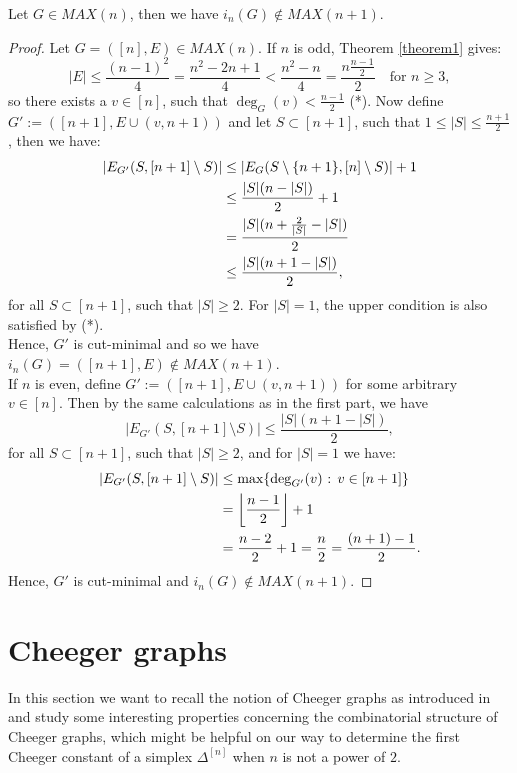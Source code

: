\begin{prop}
Let \(G\in MAX(n)\), then we have \(i_n(G)\notin MAX(n+1)\).
\begin{proof}
Let \(G=([n],E)\in MAX(n)\). If \(n\) is odd, Theorem \ref{theorem1} gives:
\[
|E|\leq\frac{(n-1)^2}{4}=\frac{n^2-2n+1}{4}<\frac{n^2-n}{4}=\frac{n\frac{n-1}{2}}{2}\quad\text{for }n\geq 3,
\]
so there exists a \(v\in [n]\), such that \(\deg_G(v)<\frac{n-1}{2}\) (*). Now define\\
\(G':=([n+1],E\cup (v,n+1))\) and let \(S\subset [n+1]\), such that \(1\leq |S|\leq\frac{n+1}{2}\), then we have:
\begin{align}
|E_{G'}(S,[n+1]\setminus S)|&\leq |E_G(S\setminus\{n+1\},[n]\setminus S)|+1\notag\\
&\leq\frac{|S|(n-|S|)}{2}+1\notag\\
&=\frac{|S|(n+\frac{2}{|S|}-|S|)}{2}\notag\\
&\leq\frac{|S|(n+1-|S|)}{2},\notag
\end{align}
for all \(S\subset [n+1]\), such that \(|S|\geq 2\). For \(|S|=1\), the upper condition is also satisfied by (*).\\
Hence, \(G'\) is cut-minimal and so we have \(i_n(G)=([n+1],E)\notin MAX(n+1)\).\\
If \(n\) is even, define \(G':=([n+1],E\cup (v,n+1))\) for some arbitrary \(v\in [n]\). Then by the same calculations as in the first part, we have
\[
|E_{G'}(S,[n+1]\setminus S)|\leq\frac{|S|(n+1-|S|)}{2},
\]
for all \(S\subset [n+1]\), such that \(|S|\geq 2\), and for \(|S|=1\) we have:
\begin{align}
|E_{G'}(S,[n+1]\setminus S)|&\leq\text{max}\{\deg_{G'}(v)\text{ : }v\in[n+1]\}\notag\\
&=\left\lfloor\frac{n-1}{2}\right\rfloor +1\notag\\
&=\frac{n-2}{2}+1=\frac{n}{2}=\frac{(n+1)-1}{2}.\notag
\end{align}
Hence, \(G'\) is cut-minimal and \(i_n(G)\notin MAX(n+1)\).
\end{proof}
\end{prop}

\section{Cheeger graphs}\label{section32}

In this section we want to recall the notion of Cheeger graphs as introduced in \cite{1} and study some interesting properties concerning the combinatorial structure of Cheeger graphs, which might be helpful on our way to determine the first Cheeger constant of a simplex \(\Delta^{[n]}\) when \(n\) is not a power of \(2\).

